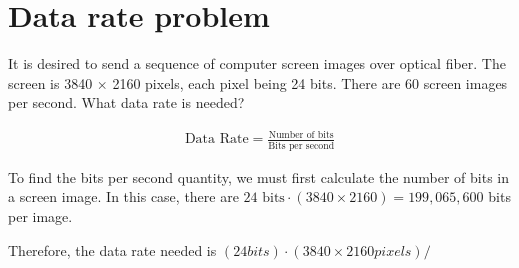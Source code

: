 
\section{Data rate problem}
It is desired to send a sequence of computer screen images over optical fiber. The screen is 3840 $\times$ 2160 pixels, each pixel being 24 bits. There are 60 screen images per second. What data rate is needed?

\begin{align*}
	\text{Data Rate} = \frac{\text{Number of bits}}{\text{Bits per second}}
\end{align*}

To find the bits per second quantity, we must first calculate the number of bits in a screen image. In this case, there are $24 \text{ bits} \cdot (3840 \times 2160) = 199,065,600$ bits per image.

Therefore, the data rate needed is $(24 bits) \cdot (3840 \times 2160 pixels) / $

\section{}
\section{}
\section{}
\section{}
\section{}
\section{}
